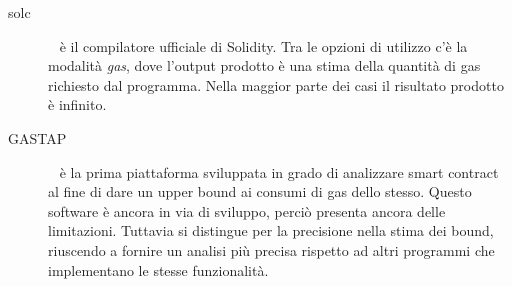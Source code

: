 \begin{description}

    \item[solc] ~\cite{solidity-docs} è il compilatore ufficiale di Solidity. Tra le opzioni di utilizzo c'è la modalità \textit{gas}, dove l'output prodotto è una stima della quantità di gas richiesto dal programma. Nella maggior parte dei casi il risultato prodotto è infinito.\newline

    \item[GASTAP] ~\cite{DBLP:journals/corr/abs-1811-10403} è la prima piattaforma sviluppata in grado di analizzare smart contract al fine di dare un upper bound ai consumi di gas dello stesso. Questo software è ancora in via di sviluppo, perciò presenta ancora delle limitazioni. Tuttavia si distingue per la precisione nella stima dei bound, riuscendo a fornire un analisi più precisa rispetto ad altri programmi che implementano le stesse funzionalità. 

\end{description}
